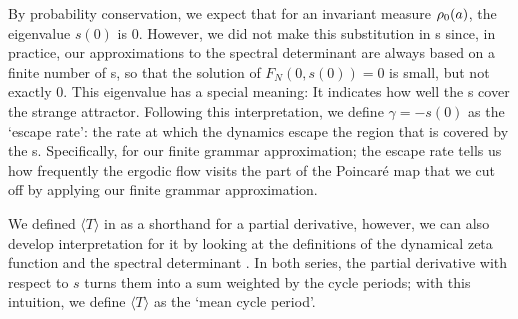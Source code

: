 
By probability conservation, we expect that for an invariant measure
$\rho_0(a)$, the eigenvalue $s(0)$ is $0$. However, we did not make
this substitution in \cycForm s since, in practice, our approximations to
the spectral determinant are always based on a finite number of \po s, so
that the solution of $F_N(0, s(0)) = 0$ is small, but not exactly $0$. This
eigenvalue has a special meaning: It indicates how well the \po s cover
the strange attractor. Following this interpretation, we define $\gamma =
- s(0)$ as the `escape rate': the rate at which the dynamics escape the
region that is covered by the \po s. Specifically, for our finite grammar
approximation; the escape rate tells us how frequently the ergodic flow
visits the part of the Poincar\'e map that we cut off by applying our
finite grammar approximation.

We defined $\langle T \rangle$ in  as a shorthand for a partial
derivative, however, we can also develop  interpretation for it by looking
at the definitions of the dynamical zeta function  and the
spectral determinant . In both series, the partial
derivative with respect to $s$ turns them into a sum weighted by the cycle
periods; with this intuition, we define $\langle T \rangle$ as the `mean cycle
period'.

